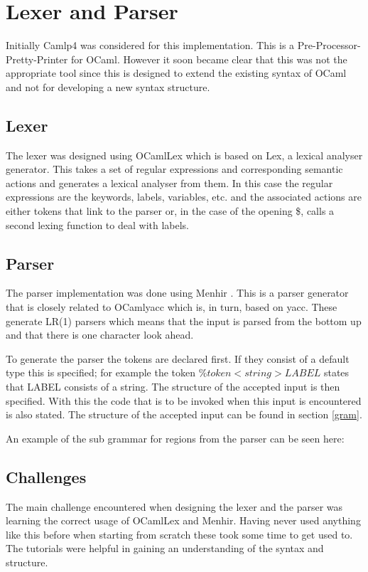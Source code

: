 \section{Lexer and Parser}

Initially Camlp4 \cite{camlp4} was considered for this implementation. This is a Pre-Processor-Pretty-Printer for OCaml. However it soon became clear that this was not the appropriate tool since this is designed to extend the existing syntax of OCaml and not for developing a new syntax structure. 

\subsection{Lexer}
The lexer was designed using OCamlLex which is based on Lex, a lexical analyser generator. This takes a set of regular expressions and corresponding semantic actions and generates a lexical analyser from them. In this case the regular expressions are the keywords, labels, variables, etc. and the associated actions are either tokens that link to the parser or, in the case of the opening \$, calls a second lexing function to deal with labels. 

\subsection{Parser}
The parser implementation was done using Menhir \cite{menhirRef}. This is a parser generator that is closely related to OCamlyacc which is, in turn, based on yacc. These generate LR(1) parsers which means that the input is parsed from the bottom up and that there is one character look ahead. 

To generate the parser the tokens are declared first. If they consist of a default type this is specified; for example the token $\%token <string> LABEL$ states that LABEL consists of a string. The structure of the accepted input is then specified. With this the code that is to be invoked when this input is encountered is also stated. The structure of the accepted input can be found in section \ref{gram}.

An example of the sub grammar for regions from the parser can be seen here:




\subsection{Challenges}
The main challenge encountered when designing the lexer and the parser was learning the correct usage of OCamlLex and Menhir. Having never used anything like this before when starting from scratch these took some time to get used to. The tutorials \cite{miniOcaml}\cite{menhirBlog}\cite[Chapter 16]{realOcaml} were helpful in gaining an understanding of the syntax and structure. 

